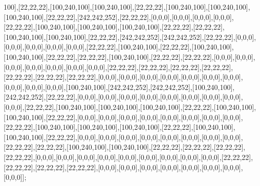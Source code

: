 100],[22,22,22],[100,240,100],[100,240,100],[22,22,22],[100,240,100],[100,240,100],[100,240,100],[22,22,22],[242,242,252],[22,22,22],[0,0,0],[0,0,0],[0,0,0],[0,0,0],[22,22,22],[100,240,100],[100,240,100],[100,240,100],[22,22,22],[22,22,22],[100,240,100],[100,240,100],[22,22,22],[242,242,252],[242,242,252],[22,22,22],[0,0,0],[0,0,0],[0,0,0],[0,0,0],[0,0,0],[22,22,22],[100,240,100],[22,22,22],[100,240,100],[100,240,100],[22,22,22],[22,22,22],[100,240,100],[22,22,22],[22,22,22],[0,0,0],[0,0,0],[0,0,0],[0,0,0],[0,0,0],[0,0,0],[0,0,0],[22,22,22],[22,22,22],[22,22,22],[22,22,22],[22,22,22],[22,22,22],[22,22,22],[0,0,0],[0,0,0],[0,0,0],[0,0,0],[0,0,0],[0,0,0],[0,0,0],[0,0,0],[0,0,0],[0,0,0],[100,240,100],[242,242,252],[242,242,252],[100,240,100],[242,242,252],[22,22,22],[0,0,0],[0,0,0],[0,0,0],[0,0,0],[0,0,0],[0,0,0],[0,0,0],[0,0,0],[0,0,0],[22,22,22],[100,240,100],[100,240,100],[100,240,100],[22,22,22],[100,240,100],[100,240,100],[22,22,22],[0,0,0],[0,0,0],[0,0,0],[0,0,0],[0,0,0],[0,0,0],[0,0,0],[0,0,0],[22,22,22],[100,240,100],[100,240,100],[100,240,100],[22,22,22],[100,240,100],[100,240,100],[22,22,22],[0,0,0],[0,0,0],[0,0,0],[0,0,0],[0,0,0],[0,0,0],[0,0,0],[0,0,0],[22,22,22],[22,22,22],[100,240,100],[100,240,100],[22,22,22],[22,22,22],[22,22,22],[22,22,22],[0,0,0],[0,0,0],[0,0,0],[0,0,0],[0,0,0],[0,0,0],[0,0,0],[0,0,0],[0,0,0],[22,22,22],[22,22,22],[22,22,22],[22,22,22],[0,0,0],[0,0,0],[0,0,0],[0,0,0],[0,0,0],[0,0,0],[0,0,0],[0,0,0]];

